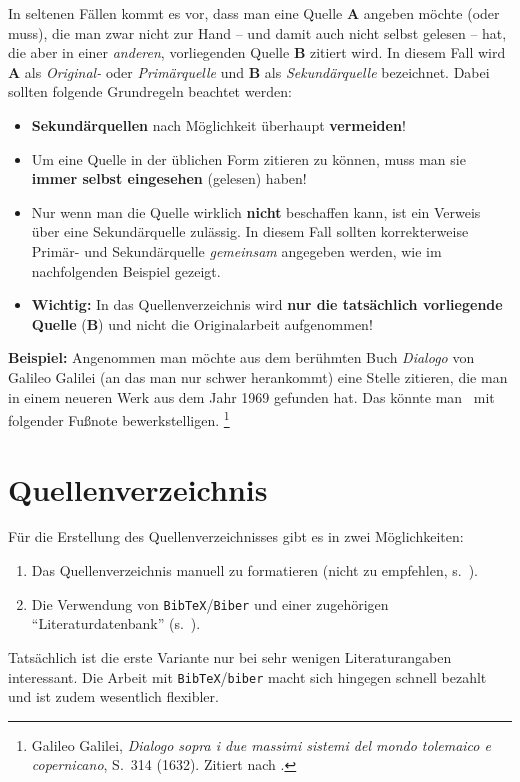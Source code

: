 In seltenen Fällen kommt es vor, dass man eine Quelle \textbf{A} angeben
möchte (oder muss), die man zwar nicht zur Hand -- und damit auch nicht selbst gelesen --
hat, die aber in einer \emph{anderen}, vorliegenden Quelle \textbf{B} zitiert wird.
In diesem Fall wird \textbf{A} als \emph{Original-} oder \emph{Primärquelle} und \textbf{B} 
als \emph{Sekundärquelle} bezeichnet. Dabei sollten folgende Grundregeln beachtet werden:
%
\begin{itemize}
\item
\textbf{Sekundärquellen} nach Möglichkeit überhaupt \textbf{vermeiden}!
\item
Um eine Quelle in der üblichen Form zitieren zu können, muss man sie \textbf{immer selbst
eingesehen} (gelesen) haben!
\item
Nur wenn man die Quelle wirklich \textbf{nicht} beschaffen kann, ist ein Verweis über eine Sekundärquelle
zulässig. In diesem Fall sollten korrekterweise Pri\-mär- und Sekundärquelle \emph{gemeinsam} 
angegeben werden, wie im nachfolgenden Beispiel gezeigt.
\item
\textbf{Wichtig:} In das Quellenverzeichnis wird \textbf{nur die tatsächlich vorliegende Quelle} 
(\textbf{B}) und nicht die Originalarbeit aufgenommen!
\end{itemize}
%
\textbf{Beispiel:} Angenommen man möchte aus dem berühmten Buch \emph{Dialogo} von Galileo Galilei 
(an das man nur schwer herankommt) eine Stelle zitieren, die man in einem neueren Werk aus dem Jahr 1969 
gefunden hat. Das könnte man \zB\ mit folgender Fußnote bewerkstelligen.%
\footnote{Galileo Galilei, \emph{Dialogo sopra i due massimi sistemi del mondo tolemaico e copernicano}, 
S.~314 (1632). Zitiert nach \cite[S.~59]{Hemleben1969}.} %


\section{Quellenverzeichnis}

Für die Erstellung des Quellenverzeichnisses gibt es in \latex zwei
Möglichkeiten:
\begin{enumerate}
\item Das Quellenverzeichnis manuell zu formatieren (nicht zu empfehlen, 
s.\ \cite[Abschn.\ 11.3]{Kopka2003}).
\item Die Verwendung von \texttt{BibTeX}/\texttt{Biber} und einer zugehörigen 
"`Literaturdatenbank"' (s.\ \cite[Kap.\ 12]{Kopka2003}).
\end{enumerate}
Tatsächlich ist die erste Variante nur bei sehr wenigen Literaturangaben interessant.
Die Arbeit mit \texttt{BibTeX}/\texttt{biber} macht sich hingegen schnell bezahlt und ist zudem wesentlich
flexibler.

